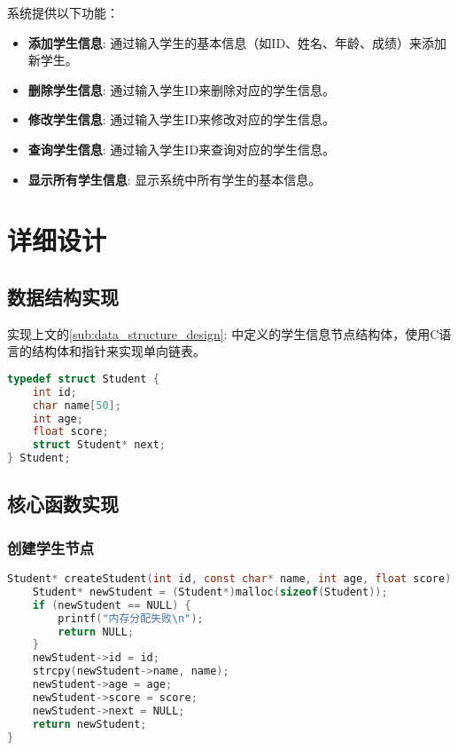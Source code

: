 系统提供以下功能：
\begin{itemize}
    \item \textbf{添加学生信息}: 通过输入学生的基本信息（如ID、姓名、年龄、成绩）来添加新学生。
    \item \textbf{删除学生信息}: 通过输入学生ID来删除对应的学生信息。
    \item \textbf{修改学生信息}: 通过输入学生ID来修改对应的学生信息。
    \item \textbf{查询学生信息}: 通过输入学生ID来查询对应的学生信息。
    \item \textbf{显示所有学生信息}: 显示系统中所有学生的基本信息。
\end{itemize}

\section{详细设计}

\subsection{数据结构实现}

实现上文的\ref{sub:data_structure_design}: 中定义的学生信息节点结构体，使用C语言的结构体和指针来实现单向链表。

\begin{lstlisting}[language=C, caption=学生信息节点结构体]
typedef struct Student {
    int id;
    char name[50];
    int age;
    float score;
    struct Student* next;
} Student;
\end{lstlisting}

\subsection{核心函数实现}

\subsubsection{创建学生节点}
\begin{lstlisting}[language=C, caption=创建学生节点函数]
Student* createStudent(int id, const char* name, int age, float score) {
    Student* newStudent = (Student*)malloc(sizeof(Student));
    if (newStudent == NULL) {
        printf("内存分配失败\n");
        return NULL;
    }
    newStudent->id = id;
    strcpy(newStudent->name, name);
    newStudent->age = age;
    newStudent->score = score;
    newStudent->next = NULL;
    return newStudent;
}
\end{lstlisting}